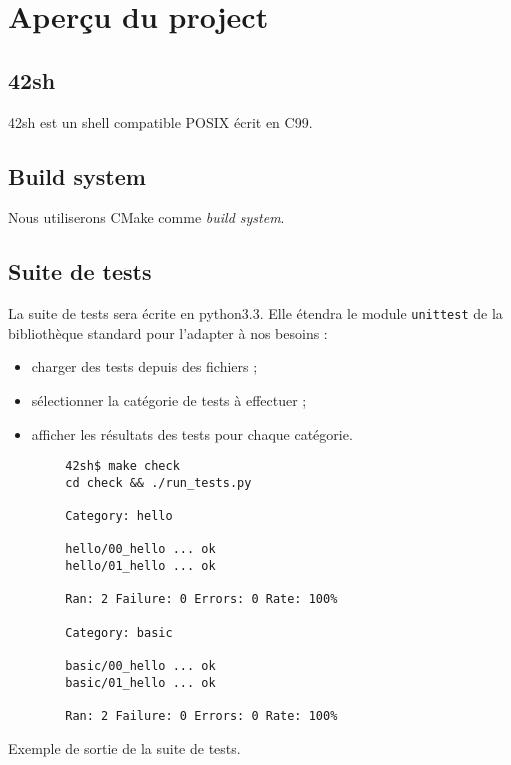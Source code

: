 \section{Aperçu du project}

\subsection{42sh}

42sh est un shell compatible POSIX écrit en C99.

\subsection{Build system}

Nous utiliserons CMake comme \emph{build system}.

\subsection{Suite de tests}

La suite de tests sera écrite en python3.3. Elle étendra le module
\texttt{unittest} de la bibliothèque standard pour l'adapter à nos besoins :

\begin{itemize}
    \item charger des tests depuis des fichiers ;
    \item sélectionner la catégorie de tests à effectuer ;
    \item afficher les résultats des tests pour chaque catégorie.
\end{itemize}

\begin{listing}[H]
    \begin{verbatim}
        42sh$ make check
        cd check && ./run_tests.py

        Category: hello

        hello/00_hello ... ok
        hello/01_hello ... ok

        Ran: 2 Failure: 0 Errors: 0 Rate: 100%

        Category: basic

        basic/00_hello ... ok
        basic/01_hello ... ok

        Ran: 2 Failure: 0 Errors: 0 Rate: 100%
    \end{verbatim}
    \caption{Exemple de sortie de la suite de tests.}
\end{listing}

